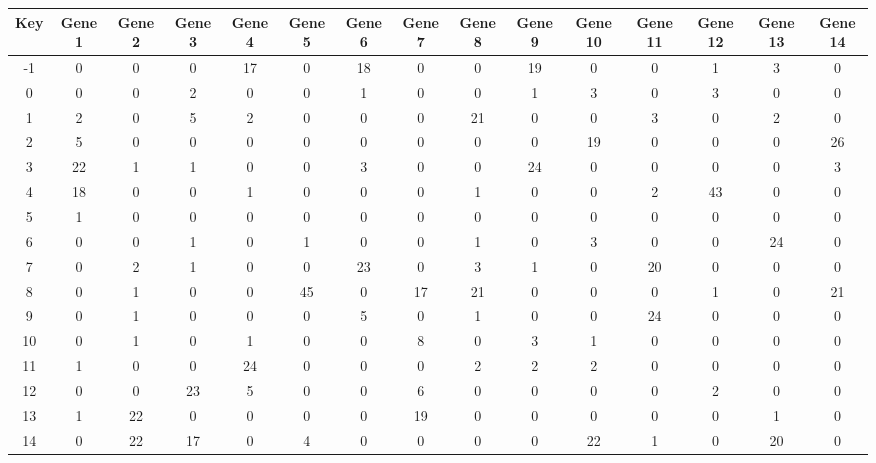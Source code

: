 \begin{tabular}{|c|c|c|c|c|c|c|c|c|c|c|c|c|c|c|}
\hline
Key & Gene 1 & Gene 2 & Gene 3 & Gene 4 & Gene 5 & Gene 6 & Gene 7 & Gene 8 & Gene 9 & Gene 10 & Gene 11 & Gene 12 & Gene 13 & Gene 14 \\
\hline
-1 & 0 & 0 & 0 & 17 & 0 & 18 & 0 & 0 & 19 & 0 & 0 & 1 & 3 & 0 \\
0 & 0 & 0 & 2 & 0 & 0 & 1 & 0 & 0 & 1 & 3 & 0 & 3 & 0 & 0 \\
1 & 2 & 0 & 5 & 2 & 0 & 0 & 0 & 21 & 0 & 0 & 3 & 0 & 2 & 0 \\
2 & 5 & 0 & 0 & 0 & 0 & 0 & 0 & 0 & 0 & 19 & 0 & 0 & 0 & 26 \\
3 & 22 & 1 & 1 & 0 & 0 & 3 & 0 & 0 & 24 & 0 & 0 & 0 & 0 & 3 \\
4 & 18 & 0 & 0 & 1 & 0 & 0 & 0 & 1 & 0 & 0 & 2 & 43 & 0 & 0 \\
5 & 1 & 0 & 0 & 0 & 0 & 0 & 0 & 0 & 0 & 0 & 0 & 0 & 0 & 0 \\
6 & 0 & 0 & 1 & 0 & 1 & 0 & 0 & 1 & 0 & 3 & 0 & 0 & 24 & 0 \\
7 & 0 & 2 & 1 & 0 & 0 & 23 & 0 & 3 & 1 & 0 & 20 & 0 & 0 & 0 \\
8 & 0 & 1 & 0 & 0 & 45 & 0 & 17 & 21 & 0 & 0 & 0 & 1 & 0 & 21 \\
9 & 0 & 1 & 0 & 0 & 0 & 5 & 0 & 1 & 0 & 0 & 24 & 0 & 0 & 0 \\
10 & 0 & 1 & 0 & 1 & 0 & 0 & 8 & 0 & 3 & 1 & 0 & 0 & 0 & 0 \\
11 & 1 & 0 & 0 & 24 & 0 & 0 & 0 & 2 & 2 & 2 & 0 & 0 & 0 & 0 \\
12 & 0 & 0 & 23 & 5 & 0 & 0 & 6 & 0 & 0 & 0 & 0 & 2 & 0 & 0 \\
13 & 1 & 22 & 0 & 0 & 0 & 0 & 19 & 0 & 0 & 0 & 0 & 0 & 1 & 0 \\
14 & 0 & 22 & 17 & 0 & 4 & 0 & 0 & 0 & 0 & 22 & 1 & 0 & 20 & 0 \\
\hline
\end{tabular}